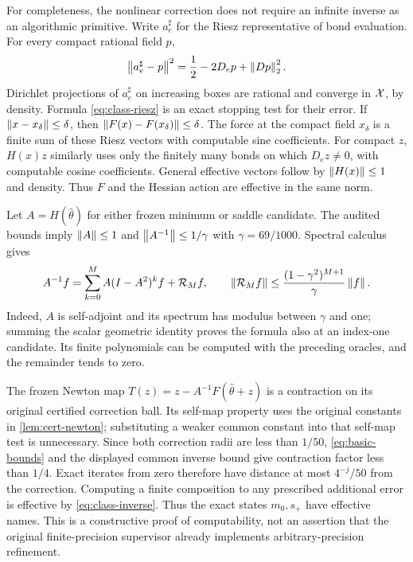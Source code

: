 For completeness, the nonlinear correction does not require an infinite
inverse as an algorithmic primitive. Write $a_e^\sharp$ for the Riesz
representative of bond evaluation. For every compact rational field $p$,
\begin{equation}\label{eq:class-riesz}
 \left\lVert a_e^\sharp-p\right\rVert^2
       =\frac12-2D_ep+\left\lVert Dp\right\rVert_2^2.
\end{equation}
Dirichlet projections of $a_e^\sharp$ on increasing boxes are rational
and converge in $\mathcal X$, by density. Formula \eqref{eq:class-riesz}
is an exact stopping test for their error. If
$\left\lVert x-x_\delta\right\rVert\le\delta$, then
$\left\lVert F(x)-F(x_\delta)\right\rVert\le\delta$. The force at the compact field
$x_\delta$ is a finite sum of these Riesz vectors with computable sine
coefficients. For compact $z$, $H(x)z$ similarly uses only the finitely
many bonds on which $D_ez\ne0$, with computable cosine coefficients.
General effective vectors follow by $\left\lVert H(x)\right\rVert\le1$ and density.
Thus $F$ and the Hessian action are effective in the same norm.

Let $A=H(\widehat\theta)$ for either frozen minimum or saddle candidate.
The audited bounds imply $\left\lVert A\right\rVert\le1$ and
$\left\lVert A^{-1}\right\rVert\le1/\gamma$ with $\gamma=69/1000$. Spectral calculus gives
\begin{equation}\label{eq:class-inverse}
 A^{-1}f=\sum_{k=0}^{M}A(I-A^2)^kf+\mathcal R_Mf,\qquad
 \left\lVert\mathcal R_Mf\right\rVert\le
 \frac{(1-\gamma^2)^{M+1}}{\gamma}\left\lVert f\right\rVert.
\end{equation}
Indeed, $A$ is self-adjoint and its spectrum has modulus between
$\gamma$ and one; summing the scalar geometric identity proves the
formula also at an index-one candidate. Its finite polynomials can be
computed with the preceding oracles, and the remainder tends to zero.

The frozen Newton map $T(z)=z-A^{-1}F(\widehat\theta+z)$ is a
contraction on its original certified correction ball. Its self-map
property uses the original constants in
\cref{lem:cert-newton}; substituting a weaker common constant into that
self-map test is unnecessary. Since both correction radii are less than
$1/50$, \eqref{eq:basic-bounds} and the displayed common inverse bound
give contraction factor less than $1/4$. Exact iterates from zero
therefore have distance at most $4^{-j}/50$ from the correction.
Computing a finite composition to any prescribed additional error is
effective by \eqref{eq:class-inverse}. Thus the exact states $m_0,s_+$
have effective names. This is a constructive proof of computability,
not an assertion that the original finite-precision supervisor already
implements arbitrary-precision refinement.

